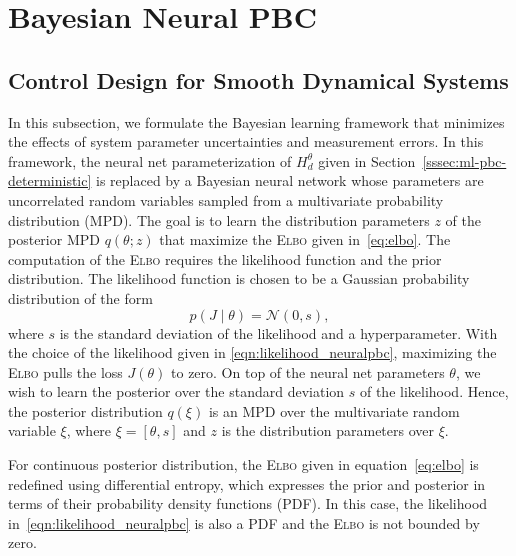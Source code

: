 
\section{Bayesian Neural PBC}

\subsection{Control Design for Smooth Dynamical Systems}
In this subsection, we formulate the Bayesian learning framework that minimizes
the effects of system parameter uncertainties and measurement errors. 
%
In this framework, the neural net parameterization of $H^\theta_d$ given in
Section~\ref{sssec:ml-pbc-deterministic} is replaced by a Bayesian neural
network whose parameters are uncorrelated random variables sampled from a
multivariate probability distribution (MPD).
%
The goal is to learn the distribution parameters $z$ of the posterior MPD
$q(\theta;z)$ that maximize the \textsc{Elbo} given in~\eqref{eq:elbo}. 
%
%
The computation of the \textsc{Elbo} requires the likelihood function and the
prior distribution.
%
The likelihood function is chosen to be a Gaussian probability
distribution of the form
\begin{equation}
    p(J \mid \theta) = \mathcal{N}\left(0, s \right),
    \label{eqn:likelihood_neuralpbc}
\end{equation}
where $s$ is the standard deviation of the likelihood and a hyperparameter. 
%
With the choice of the likelihood given in \eqref{eqn:likelihood_neuralpbc},
maximizing the \textsc{Elbo} pulls the loss $J(\theta)$ to zero.
%
On top of the neural net parameters $\theta$, we wish to learn the posterior
over the standard deviation $s$ of the likelihood. 
%
Hence, the posterior distribution $q(\xi)$ is an MPD over the multivariate
random variable $\xi$, where $\xi = [\theta, s]$ and $z$ is the distribution
parameters over $\xi$.
%
\begin{rem}
    For continuous posterior distribution, the \textsc{Elbo} given in
    equation~\eqref{eq:elbo} is redefined using differential entropy, which
    expresses the prior and posterior in terms of their probability density
    functions (PDF). In this case, the likelihood
    in~\eqref{eqn:likelihood_neuralpbc} is also a PDF and the \textsc{Elbo} is
    not bounded by zero.
\end{rem}

